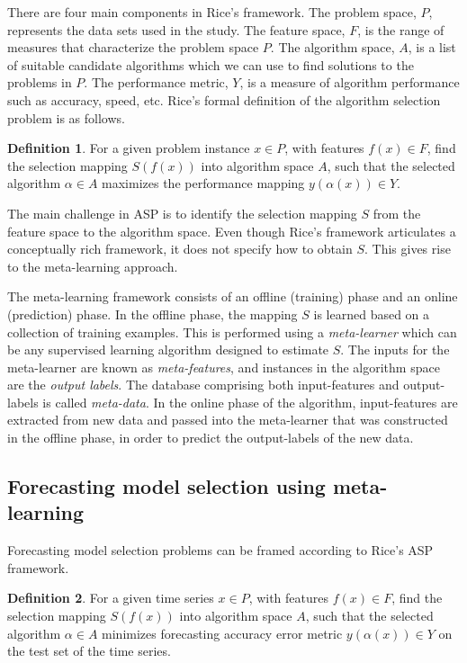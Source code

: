 \documentclass[11pt,a4paper,]{article}
\theoremstyle{definition}
\newtheorem{definition}{Definition}[section]
\theoremstyle{definition}
\theoremstyle{definition}
\theoremstyle{remark}
\begin{document}
There are four main components in Rice's framework. The problem space,
\(P\), represents the data sets used in the study. The feature space,
\(F\), is the range of measures that characterize the problem space
\(P\). The algorithm space, \(A\), is a list of suitable candidate
algorithms which we can use to find solutions to the problems in \(P\).
The performance metric, \(Y\), is a measure of algorithm performance
such as accuracy, speed, etc. Rice's formal definition of the algorithm
selection problem is \autocite{smith2009cross} as follows.

\begin{definition}
\label{def2}
For a given problem instance $x \in P$, with features $f(x) \in F$, find the selection mapping $S(f(x))$ into algorithm space $A$, such that the selected algorithm $\alpha \in A$ maximizes the performance mapping $y(\alpha(x)) \in Y$.
\end{definition}

The main challenge in ASP is to identify the selection mapping \(S\)
from the feature space to the algorithm space. Even though Rice's
framework articulates a conceptually rich framework, it does not specify
how to obtain \(S\). This gives rise to the meta-learning approach.

The meta-learning framework consists of an offline (training) phase and
an online (prediction) phase. In the offline phase, the mapping \(S\) is
learned based on a collection of training examples. This is performed
using a \emph{meta-learner} which can be any supervised learning
algorithm designed to estimate \(S\). The inputs for the meta-learner
are known as \emph{meta-features}, and instances in the algorithm space
are the \emph{output labels}. The database comprising both
input-features and output-labels is called \emph{meta-data}. In the
online phase of the algorithm, input-features are extracted from new
data and passed into the meta-learner that was constructed in the
offline phase, in order to predict the output-labels of the new data.

\subsection{Forecasting model selection using
meta-learning}\label{forecasting-model-selection-using-meta-learning}

Forecasting model selection problems can be framed according to Rice's
ASP framework.

\begin{definition}
\label{def2}
For a given time series $x \in P$, with features $f(x) \in F$, find the selection mapping $S(f(x))$ into algorithm space $A$, such that the selected algorithm $\alpha \in A$ minimizes forecasting accuracy error metric $y(\alpha(x)) \in Y$ on the test set of the time series.
\end{definition}
\end{document}
